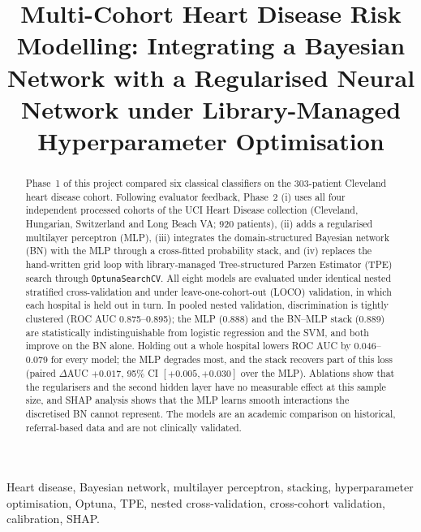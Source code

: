 \documentclass[conference]{IEEEtran}
\newcommand{\code}[1]{\texttt{\small #1}}
\begin{document}
\title{Multi-Cohort Heart Disease Risk Modelling: Integrating a Bayesian Network with a Regularised Neural Network under Library-Managed Hyperparameter Optimisation}

\author{
}

\maketitle

\begin{abstract}
Phase~1 of this project compared six classical classifiers on the 303-patient Cleveland heart disease cohort. Following evaluator feedback, Phase~2 (i) uses all four independent processed cohorts of the UCI Heart Disease collection (Cleveland, Hungarian, Switzerland and Long Beach VA; 920 patients), (ii) adds a regularised multilayer perceptron (MLP), (iii) integrates the domain-structured Bayesian network (BN) with the MLP through a cross-fitted probability stack, and (iv) replaces the hand-written grid loop with library-managed Tree-structured Parzen Estimator (TPE) search through \code{OptunaSearchCV}. All eight models are evaluated under identical nested stratified cross-validation and under leave-one-cohort-out (LOCO) validation, in which each hospital is held out in turn. In pooled nested validation, discrimination is tightly clustered (ROC AUC 0.875--0.895); the MLP (0.888) and the BN--MLP stack (0.889) are statistically indistinguishable from logistic regression and the SVM, and both improve on the BN alone. Holding out a whole hospital lowers ROC AUC by 0.046--0.079 for every model; the MLP degrades most, and the stack recovers part of this loss (paired $\Delta$AUC $+0.017$, 95\% CI $[+0.005, +0.030]$ over the MLP). Ablations show that the regularisers and the second hidden layer have no measurable effect at this sample size, and SHAP analysis shows that the MLP learns smooth interactions the discretised BN cannot represent. The models are an academic comparison on historical, referral-based data and are not clinically validated.
\end{abstract}

\begin{IEEEkeywords}
Heart disease, Bayesian network, multilayer perceptron, stacking, hyperparameter optimisation, Optuna, TPE, nested cross-validation, cross-cohort validation, calibration, SHAP.
\end{IEEEkeywords}
\end{document}

